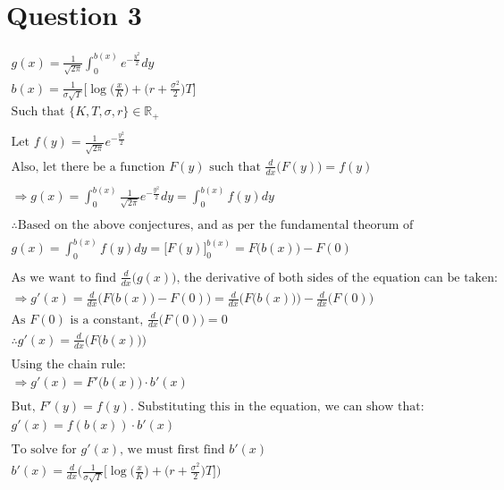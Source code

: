 \documentclass[letterpaper,10pt]{article}
\newcommand{\ddx}[1]{\frac{d}{dx} \bigg( #1 \bigg)}
\begin{document}
	\section{Question 3}
		\begin{gather*}
			g(x) = \frac{1}{\sqrt{2\pi}} \int_{0}^{b(x)} e^{-\frac{y^2}{2}} dy \\
			b(x) = \frac{1}{\sigma\sqrt{T}} \bigg[ \log \Big(\frac{x}{K}\Big) + \bigg( r + \frac{\sigma^2}{2} \bigg) T \bigg] \\
			\text{Such that } \{K, T, \sigma, r\} \in \mathbb R_{+} \\ \\
			\text{Let } f(y) = \frac{1}{\sqrt{2\pi}} e^{-\frac{y^2}{2}} \\
			\text{Also, let there be a function } F(y) \text{ such that } \ddx{F(y)} = f(y) \\ \\
			\Rightarrow g(x) = \int_{0}^{b(x)} \frac{1}{\sqrt{2\pi}} e^{-\frac{y^2}{2}} dy = \int_{0}^{b(x)} f(y) dy \\ \\
			\therefore \text{Based on the above conjectures, and as per the fundamental theorum of calculus (FTC):} \\
			g(x) = \int_{0}^{b(x)} f(y) dy = \bigg[F(y)\bigg]_{0}^{b(x)} = F\big(b(x)\big) - F(0)\\ \\
			\text{As we want to find } \ddx{g(x)} \text{, the derivative of both sides of the equation can be taken:} \\
			\Rightarrow g\prime(x) = \ddx{F\big(b(x)\big) - F(0)} = \ddx{F\big(b(x)\big)} - \ddx{F(0)}\\
			\text{As } F(0) \text{ is a constant, } \ddx{F(0)} = 0 \\
			\therefore g\prime(x) = \ddx{F\big(b(x)\big)} \\ \\
			\text{Using the chain rule:}\\
			\Rightarrow g\prime(x) = F\prime\big(b(x)\big) \cdot b\prime(x) \\ \\
			\text{But, } F\prime(y) = f(y) \text{. Substituting this in the equation, we can show that:}\\
			g\prime(x) = f(b(x)) \cdot b\prime(x)\\ \\
			\text{To solve for } g\prime(x) \text{, we must first find } b\prime(x) \\
			b\prime(x) = \ddx{\frac{1}{\sigma\sqrt{T}} \bigg[ \log \Big(\frac{x}{K}\Big) + \bigg( r + \frac{\sigma^2}{2} \bigg) T \bigg]}

\end{gather*}
\end{document}
